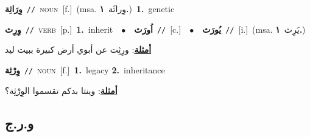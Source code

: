 \documentclass[10pt,a4paper,twoside]{article} %
\begin{document}
\begin{multicols}{2}
{\setlength\topsep{0pt}\textbf{\foreignlanguage{arabic}{وِرَاثِة}}\ {\color{gray}\texttt{//}\color{black}}\ \textsc{noun}\ [f.]\ \color{gray}(msa. \foreignlanguage{arabic}{وِراثَة}~\foreignlanguage{arabic}{\textbf{١.}})\color{black}\ \textbf{1.}~genetic\ } \vspace{2mm}

{\setlength\topsep{0pt}\textbf{\foreignlanguage{arabic}{وِرِث}}\ {\color{gray}\texttt{//}\color{black}}\ \textsc{verb}\ [p.]\ \textbf{1.}~inherit\ \ $\bullet$\ \ \setlength\topsep{0pt}\textbf{\foreignlanguage{arabic}{اُورَث}}\ {\color{gray}\texttt{//}\color{black}}\ [c.]\ \ $\bullet$\ \ \setlength\topsep{0pt}\textbf{\foreignlanguage{arabic}{يُورَث}}\ {\color{gray}\texttt{//}\color{black}}\ [i.]\ \color{gray}(msa. \foreignlanguage{arabic}{يَرِث}~\foreignlanguage{arabic}{\textbf{١.}})\color{black}\  \begin{flushright}\color{gray}\foreignlanguage{arabic}{\textbf{\underline{\foreignlanguage{arabic}{أمثلة}}}: ورِثِت عن أبوي أرض كبيرة ببيت ليد}\end{flushright}\color{black}} \vspace{2mm}

{\setlength\topsep{0pt}\textbf{\foreignlanguage{arabic}{وِرْثِة}}\ {\color{gray}\texttt{//}\color{black}}\ \textsc{noun}\ [f.]\ \textbf{1.}~legacy  \textbf{2.}~inheritance\  \begin{flushright}\color{gray}\foreignlanguage{arabic}{\textbf{\underline{\foreignlanguage{arabic}{أمثلة}}}: وينتا بدكم تقسموا الوِرْثِة؟}\end{flushright}\color{black}} \vspace{2mm}

\vspace{-3mm}
\subsection*{\color{blue}\foreignlanguage{arabic}{و.ر.ج}\color{blue}{}} 


\end{multicols}
\end{document}
